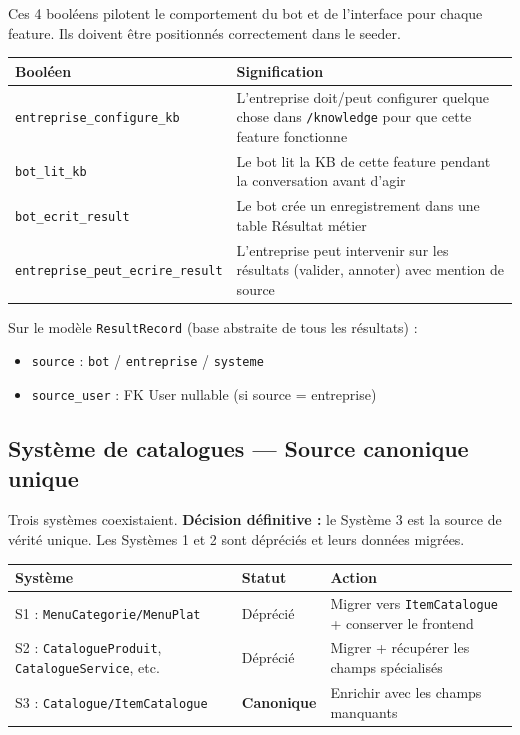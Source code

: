 \documentclass[11pt,a4paper]{article}
\newcommand{\slug}[1]{\texttt{\color{AGTDark}#1}}
\begin{document}
Ces 4 booléens pilotent le comportement du bot et de l'interface pour chaque feature.
Ils doivent être positionnés correctement dans le seeder.

\begin{center}
\begin{tabularx}{\textwidth}{lX}
\toprule
\textbf{Booléen} & \textbf{Signification} \\
\midrule
\slug{entreprise\_configure\_kb} & L'entreprise doit/peut configurer quelque chose dans \texttt{/knowledge} pour que cette feature fonctionne \\[4pt]
\slug{bot\_lit\_kb} & Le bot lit la KB de cette feature pendant la conversation avant d'agir \\[4pt]
\slug{bot\_ecrit\_result} & Le bot crée un enregistrement dans une table Résultat métier \\[4pt]
\slug{entreprise\_peut\_ecrire\_result} & L'entreprise peut intervenir sur les résultats (valider, annoter) avec mention de source \\
\bottomrule
\end{tabularx}
\end{center}

Sur le modèle \slug{ResultRecord} (base abstraite de tous les résultats) :
\begin{itemize}
  \item \slug{source} : \texttt{bot} / \texttt{entreprise} / \texttt{systeme}
  \item \slug{source\_user} : FK User nullable (si source = entreprise)
\end{itemize}

\subsection{Système de catalogues — Source canonique unique}

Trois systèmes coexistaient. \textbf{Décision définitive :} le Système 3 est la
source de vérité unique. Les Systèmes 1 et 2 sont dépréciés et leurs données migrées.

\begin{center}
\begin{tabularx}{\textwidth}{llX}
\toprule
\textbf{Système} & \textbf{Statut} & \textbf{Action} \\
\midrule
S1 : \slug{MenuCategorie/MenuPlat} & Déprécié & Migrer vers \slug{ItemCatalogue} + conserver le frontend \\[4pt]
S2 : \slug{CatalogueProduit}, \slug{CatalogueService}, etc. & Déprécié & Migrer + récupérer les champs spécialisés \\[4pt]
S3 : \slug{Catalogue/ItemCatalogue} & \textcolor{AGTGreen}{\textbf{Canonique}} & Enrichir avec les champs manquants \\
\bottomrule
\end{tabularx}
\end{center}
\end{document}
